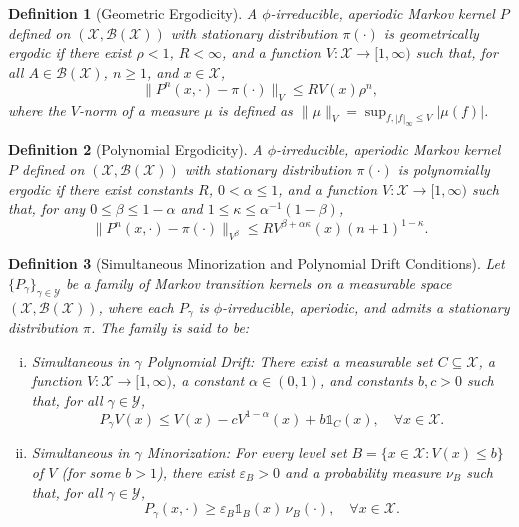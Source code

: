 \documentclass[pdflatex,sn-mathphys-num]{sn-jnl}
\newcommand{\ind}{\mathds{1}}
\renewcommand{\geq}{\geqslant}
\renewcommand{\leq}{\leqslant}
\theoremstyle{thmstyleone}
\theoremstyle{thmstyletwo}
\theoremstyle{thmstylethree}
\newtheorem{definition}{Definition}
\begin{document}
\begin{definition}[Geometric Ergodicity]  
A $\phi$-irreducible, aperiodic Markov kernel $P$ defined on $(\mathcal{X}, \mathcal{B}(\mathcal{X}))$ with stationary distribution $\pi(\cdot)$ is \textit{geometrically ergodic} if there exist $\rho < 1$, $R<\infty$, and a function $V: \mathcal{X} \to [1,\infty)$ such that, for all $A \in \mathcal{B}(\mathcal{X})$, $n \geq 1$, and $x \in \mathcal{X}$,
\[
\|P^n(x, \cdot) - \pi(\cdot)\|_V \leq RV(x)\rho^n,
\]
where the $V$-norm of a measure $\mu$ is defined as $\|\mu\|_V=\sup_{f, |f|_\infty\leq V}|\mu(f)|$.
\label{def3}
\end{definition}

\begin{definition}[Polynomial Ergodicity]  
A $\phi$-irreducible, aperiodic Markov kernel $P$ defined on $(\mathcal{X}, \mathcal{B}(\mathcal{X}))$ with stationary distribution $\pi(\cdot)$ is \textit{polynomially ergodic} if there exist constants $R$, $0<\alpha \leq 1$, and a function $V: \mathcal{X} \to [1,\infty)$ such that, for any $0 \leq \beta \leq 1 -\alpha$ 
and $1 \leq \kappa \leq \alpha^{-1}(1 - \beta)$,
\[
\|P^n(x,\cdot) - \pi(\cdot)\|_{V^\beta} \leq R V^{\beta + \alpha\kappa}(x)(n+1)^{1-\kappa}.
\]
\label{def4}
\end{definition}

\begin{definition}[Simultaneous Minorization and Polynomial Drift Conditions]
Let $\{P_\gamma\}_{\gamma \in \mathcal{Y}}$ be a family of Markov transition kernels on a measurable space $(\mathcal{X}, \mathcal{B}(\mathcal{X}))$, where each $P_\gamma$ is $\phi$-irreducible, aperiodic, and admits a stationary distribution $\pi$. The family is said to be:
\begin{enumerate}[(i)]
    \item \textit{Simultaneous in $\gamma$ Polynomial Drift:} There exist a measurable set $C \subseteq \mathcal{X}$, a function $V: \mathcal{X} \to [1,\infty)$, a constant $\alpha \in (0, 1)$, and constants $b, c > 0$ such that, for all $\gamma \in \mathcal{Y}$,
    \[
    P_\gamma V(x) \leq V(x) - c V^{1-\alpha}(x) + b \ind_C(x), \quad \forall x \in \mathcal{X}.
    \]
    \label{polynomialdrift}
    
    \item \textit{Simultaneous in $\gamma$ Minorization:} For every level set $B = \{x \in \mathcal{X} : V(x) \leq b\}$ of $V$ (for some $b > 1$), there exist $\varepsilon_B > 0$ and a probability measure $\nu_B$ such that, for all $\gamma \in \mathcal{Y}$,
    \[
    P_\gamma(x, \cdot) \geq \varepsilon_B \ind_B(x)\, \nu_B(\cdot), \quad \forall x \in \mathcal{X}.
    \]
    \label{appendix:minorization}
\end{enumerate}
\label{def5}
\end{definition}
\end{document}
